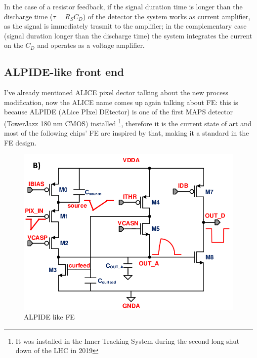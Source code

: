       In the case of a resistor feedback, if the signal duration time is longer than the discharge time ($\tau=R_S C_D$) of the detector the system works as current amplifier, as the signal is immediately trasmit to the amplifier; in the complementary case (signal duration longer than the discharge time) the system integrates the current on the $C_D$ and operates as a voltage amplifier.


   \subsection{ALPIDE-like front end}
      I've already mentioned ALICE pixel dector talking about the new process modification, now the ALICE name comes up again talking about FE: this is because ALPIDE (ALice PIxel DEtector) is one of the first MAPS detector (TowerJazz 180 nm CMOS) installed \footnote{It was installed in the Inner Tracking System during the second long shut down of the LHC in 2019}, therefore it is the current state of art and most of the following chips' FE are inspired by that, making it a standard in the FE design. 
      \begin{figure}[h!]
         \centering
         \includegraphics[width=.7\linewidth]{figures/Pixel_detectors/ALPIDE_FE.png}
         \caption{ALPIDE like FE}
         \label{fig:ALPIDE-like}
      \end{figure}

